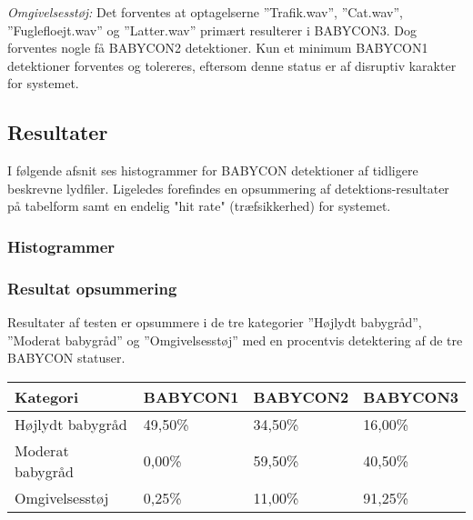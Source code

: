 \textit{Omgivelsesstøj:} Det forventes at optagelserne ''Trafik.wav'', ''Cat.wav'', ''Fuglefloejt.wav'' og ''Latter.wav'' primært resulterer i BABYCON3. Dog forventes nogle få BABYCON2 detektioner. Kun et minimum BABYCON1 detektioner forventes og tolereres, eftersom denne status er af disruptiv karakter for systemet.

\subsection*{Resultater} 
I følgende afsnit ses histogrammer for BABYCON detektioner af tidligere beskrevne lydfiler. Ligeledes forefindes en opsummering af detektions-resultater på tabelform samt en endelig "hit rate" (træfsikkerhed) for systemet.

\subsubsection{Histogrammer}

\subsubsection{Resultat opsummering}
Resultater af testen er opsummere i de tre kategorier ''Højlydt babygråd'', ''Moderat babygråd'' og ''Omgivelsesstøj'' med en procentvis detektering af de tre BABYCON statuser.

\begin{center}
    \begin{tabular}{ | l | l | l | l |}     					
    \hline
	\textbf{Kategori}	& \textbf{BABYCON1}	& \textbf{BABYCON2}	& \textbf{BABYCON3}  \\ \hline
    Højlydt babygråd	& 49,50\%			& 34,50\%			& 16,00\%   		\\ \hline
    Moderat babygråd 	& 0,00\%			& 59,50\%			& 40,50\%   		\\ \hline
    Omgivelsesstøj 		& 0,25\%			& 11,00\%			& 91,25\%   		\\ \hline
    \end{tabular}
\end{center}


